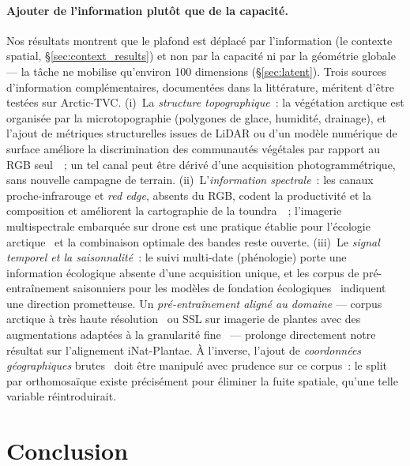 \documentclass[11pt,a4paper]{article}
\begin{document}
\paragraph{Ajouter de l'information plutôt que de la capacité.} Nos résultats montrent que le plafond est déplacé par l'information (le contexte spatial, \S\ref{sec:context_results}) et non par la capacité ni par la géométrie globale — la tâche ne mobilise qu'environ 100 dimensions (\S\ref{sec:latent}). Trois sources d'information complémentaires, documentées dans la littérature, méritent d'être testées sur Arctic-TVC. (i)~La \emph{structure topographique}~: la végétation arctique est organisée par la microtopographie (polygones de glace, humidité, drainage), et l'ajout de métriques structurelles issues de LiDAR ou d'un modèle numérique de surface améliore la discrimination des communautés végétales par rapport au RGB seul~\autocite{banerjee2022uavlidar}~; un tel canal peut être dérivé d'une acquisition photogrammétrique, sans nouvelle campagne de terrain. (ii)~L'\emph{information spectrale}~: les canaux proche-infrarouge et \emph{red edge}, absents du RGB, codent la productivité et la composition et améliorent la cartographie de la toundra~\autocite{bhuiyan2020spectral}~; l'imagerie multispectrale embarquée sur drone est une pratique établie pour l'écologie arctique~\autocite{yang2022uas} et la combinaison optimale des bandes reste ouverte. (iii)~Le \emph{signal temporel et la saisonnalité}~: le suivi multi-date (phénologie) porte une information écologique absente d'une acquisition unique, et les corpus de pré-entraînement saisonniers pour les modèles de fondation écologiques~\autocite{plekhanova2025ssl4eco} indiquent une direction prometteuse. Un \emph{pré-entraînement aligné au domaine} — corpus arctique à très haute résolution~\autocite{perera2026arctic} ou SSL sur imagerie de plantes avec des augmentations adaptées à la granularité fine~\autocite{moummad2026selfsupervised} — prolonge directement notre résultat sur l'alignement iNat-Plantae. À l'inverse, l'ajout de \emph{coordonnées géographiques} brutes~\autocite{zermatten2026gamma} doit être manipulé avec prudence sur ce corpus~: le split par orthomosaïque existe précisément pour éliminer la fuite spatiale, qu'une telle variable réintroduirait.

\section{Conclusion}
\end{document}
